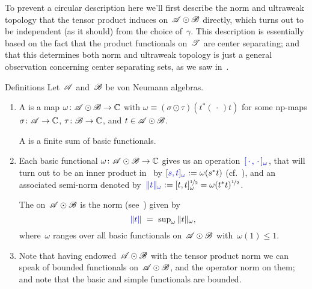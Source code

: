 \documentclass[a]{subfiles}
\begin{document}
\begin{parsec}
\begin{point}
To prevent a circular description
here
we'll first describe the norm and ultraweak topology
that the tensor product induces on~$\mathscr{A}\odot \mathscr{B}$
directly,
which turns out to be independent (as it should)
from the choice of~$\gamma$.
This description
is essentially based
on the fact that the product functionals on~$\mathscr{T}$
are center separating;
and that this determines both norm and 
ultraweak topology
is just a general 
observation concerning
center separating sets, as we saw in~.
\end{point}
\begin{point}{Definitions}%
Let~$\mathscr{A}$ and~$\mathscr{B}$ be von Neumann algebras.
\begin{enumerate}
\item
A 
is 
a map $\omega \colon \mathscr{A}\odot\mathscr{B}\to\mathbb{C}$
with
$\omega\equiv (\sigma\odot \tau)(t^*(\,\cdot\,)t)$
for some np-maps
$\sigma\colon \mathscr{A}\to\mathbb{C}$, $\tau\colon \mathscr{B}\to\mathbb{C}$,
and
$t\in \mathscr{A}\odot\mathscr{B}$.

A 
is a finite sum of basic functionals.
\item
Each basic functional $\omega \colon \mathscr{A}\odot\mathscr{B}\to\mathbb{C}$
gives us an operation~$\Define{[\,\cdot\,,\,\cdot\,]_\omega}$,
that will turn out to be an inner product in~
 by
$\Define{[s,t]_\omega}:=\omega(s^*t)$
(cf.~),
and an associated semi-norm
denoted by~$\Define{\|t\|_\omega}:=[t,t]_\omega^{\smash{\nicefrac{1}{2}}} 
= \omega(t^*t)^{\nicefrac{1}{2}}$.

The 
on~$\mathscr{A}\odot \mathscr{B}$
is the norm (see~)
given by
\begin{equation*}
	\textstyle
	\Define{\|t\|}\ =\ \sup_\omega \|t\|_\omega,
\end{equation*}
where~$\omega$ ranges over all basic functionals
on~$\mathscr{A}\odot\mathscr{B}$
with~$\omega(1)\leq 1$.
\item
Note that having endowed~$\mathscr{A}\odot \mathscr{B}$
with the tensor product norm
we can speak of bounded functionals on~$\mathscr{A}\odot \mathscr{B}$,
and the operator norm on them;
and note that
the basic and simple  functionals are bounded.


\end{enumerate}
\end{point}
\end{parsec}
\end{document}
